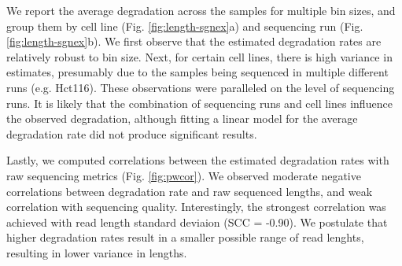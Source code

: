 We report the average degradation across the samples for multiple bin sizes, and group them by cell line (Fig. \ref{fig:length-sgnex}a) and sequencing run (Fig. \ref{fig:length-sgnex}b). We first observe that the estimated degradation rates are relatively robust to bin size. Next, for certain cell lines, there is high variance in estimates, presumably due to the samples being sequenced in multiple different runs (e.g. Hct116). These observations were paralleled on the level of sequencing runs. It is likely that the combination of sequencing runs and cell lines influence the observed degradation, although fitting a linear model for the average degradation rate did not produce significant results.

Lastly, we computed correlations between the estimated degradation rates with raw sequencing metrics (Fig. \ref{fig:pwcor}). We observed moderate negative correlations between degradation rate and raw sequenced lengths, and weak correlation with sequencing quality. Interestingly, the strongest correlation was achieved with read length standard deviaion (SCC = -0.90). We postulate that higher degradation rates result in a smaller possible range of read lenghts, resulting in lower variance in lengths.

\begin{table}[H]
  \centering
      \caption[Description of SG-NEx samples across cell lines and sequencing runs]{Description of SG-NEx samples across cell lines and sequencing runs}
  \label{tab:six-six}%
\end{table}%

